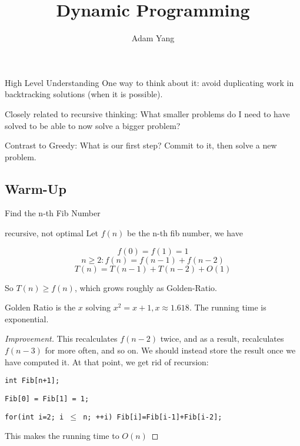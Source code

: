 \documentclass[openany]{article}
\begin{document}
\title{Dynamic Programming}
\author{Adam Yang}
\maketitle


\begin{definition*}{High Level Understanding}
    One way to think about it: avoid duplicating work in backtracking solutions (when it is possible).

    Closely related to recursive thinking: What smaller problems do I need to have solved to be able to now solve a bigger problem?

    Contrast to Greedy: What is our first step? Commit to it, then solve a new problem.
\end{definition*}

\subsection*{Warm-Up}

\begin{problem*}{}
    Find the n-th Fib Number
\end{problem*}
\begin{solution*}{recursive, not optimal}
            Let $f(n)$ be the n-th fib number, we have
        
	\[f(0)=f(1)=1\]
        \[n\geq 2: f(n)=f(n-1)+f(n-2)\]
        \[T(n)=T(n-1)+T(n-2)+O(1)\]

        So $T(n)\geq f(n)$, which grows roughly as Golden-Ratio.
        
        Golden Ratio is the $x$ solving $x^2=x+1, x\approx 1.618$. The running time is exponential.
\end{solution*}



 \begin{proof}[Improvement]{}
        		\renewcommand{\qedsymbol}{} %
                This recalculates $f(n-2)$ twice, and as a result, recalculates $f(n-3)$ for more often, and so on. We should instead store the result once we have computed it. At that point, we get rid of recursion:

        \qquad \texttt{int Fib[n+1];}\texttt{}
        
        \qquad \texttt{Fib[0] = Fib[1] = 1;}
        
        \qquad \texttt{for(int i=2; i $\leq$ n; ++i) Fib[i]=Fib[i-1]+Fib[i-2];}

        This makes the running time to $O(n)$
        \end{proof}
\end{document}
